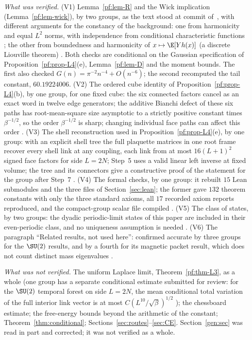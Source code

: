 \emph{What was verified.} (V1) Lemma~\ref{pf:lem-R} and the Wick implication (Lemma~\ref{pf:lem-wick}), by two groups, as the text stood at commit  of~\cite{Repo}, with different arguments for the constancy of the background: one from harmonicity and equal $L^2$ norms, with independence from conditional characteristic functions \cite[comment 7102490558]{RepoThread}; the other from boundedness and harmonicity of $x\mapsto\E[Yh(x)]$ (a discrete Liouville theorem) \cite[comment 7102590992]{RepoThread}. Both checks are conditional on the Gaussian specification of Proposition~\ref{pf:prop-L4}(e), Lemma~\ref{pf:lem-D} and the moment bounds. The first also checked $G(n)=\pi^{-2}n^{-4}+O(n^{-6})$; the second recomputed the tail constant, $60.19224006$. (V2) The ordered cube identity of Proposition~\ref{pf:prop-L4}(b), by one group, for one fixed cube: the six connected factors cancel as an exact word in twelve edge generators; the additive Bianchi defect of these six paths has root-mean-square size asymptotic to a strictly positive constant times $\beta^{-1/2}$, so the order $\beta^{-1/2}$ is sharp; changing individual face paths can affect this order \cite[comment 7104976877]{RepoThread}. (V3) The shell reconstruction used in Proposition~\ref{pf:prop-L4}(e), by one group: with an explicit shell tree the full plaquette matrices in one root frame recover every shell link at any coupling, each link from at most $16(L+1)^2$ signed face factors for side $L=2N$; Step~5 uses a valid linear left inverse at fixed volume; the tree and its connectors give a constructive proof of the statement for the group after Step~7 \cite[comment 7104825691]{RepoThread}. (V4) The formal checks, by one group: it rebuilt $15$ Lean submodules and the three files of Section~\ref{sec:lean}; the former gave $132$ theorem constants with only the three standard axioms, all $17$ recorded axiom reports reproduced, and the compact-group scalar file compiled \cite[comment 7105447358]{RepoThread}. (V5) The class of states, by two groups: the dyadic periodic-limit states of this paper are included in their even-periodic class, and no uniqueness assumption is needed \cite[comments 7105290349, 7105296546]{RepoThread}. (V6) The paragraph ``Related results, not used here'': confirmed accurate by three groups for the $\SU(2)$ results, and by a fourth for its magnetic packet result, which does not count distinct mass eigenvalues \cite[comments 7105447358, 7105100783, 7105296546, 7105348719]{RepoThread}.

\emph{What was not verified.} The uniform Laplace limit, Theorem~\ref{pf:thm-L3}, as a whole (one group has a separate conditional estimate submitted for review: for the $\SU(2)$ temporal forest on side $L=2N$, the mean conditional total variation of the full interior link vector is at most $C(L^{10}/\sqrt\beta)^{1/2}$ \cite[comment 7105447358]{RepoThread}); the chessboard estimate; the free-energy bounds beyond the arithmetic of the constant; Theorem~\ref{thm:conditional}; Sections~\ref{sec:routes}--\ref{sec:CE}. Section~\ref{gen:sec} was read in part and corrected; it was not verified as a whole.

